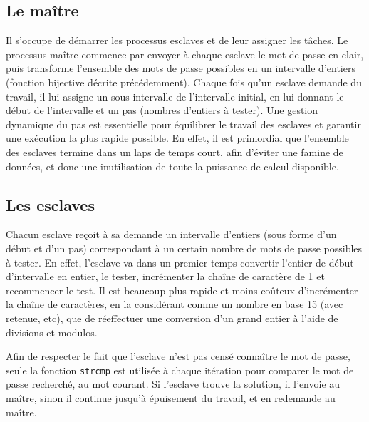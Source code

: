 \documentclass[a4paper,11pt]{article}
\begin{document}
\subsection{Le maître}
Il s'occupe de démarrer les processus esclaves et de leur assigner les tâches. Le processus maître commence par envoyer à chaque esclave le mot de passe en clair, puis transforme l'ensemble des mots de passe possibles en un intervalle d'entiers (fonction bijective décrite précédemment). Chaque fois qu'un esclave demande du travail, il lui assigne un sous intervalle de l'intervalle initial, en lui donnant le début de l'intervalle et un pas (nombres d'entiers à tester).
Une gestion dynamique du pas est essentielle pour équilibrer le travail des esclaves et garantir une exécution la plus rapide possible. En effet, il est primordial que l'ensemble des esclaves termine dans un laps de temps court, afin d'éviter une famine de données, et donc une inutilisation de toute la puissance de calcul disponible.

\subsection{Les esclaves}
Chacun esclave reçoit à sa demande un intervalle d'entiers (sous forme d'un début et d'un pas) correspondant à un certain nombre de mots de passe possibles à tester.
En effet, l'esclave va dans un premier temps convertir l'entier de début d'intervalle en entier, le tester, incrémenter la chaîne de caractère de 1 et recommencer le test.
Il est beaucoup plus rapide et moins coûteux d'incrémenter la chaîne de caractères, en la considérant comme un nombre en base 15 (avec retenue, etc), que de réeffectuer une conversion d'un grand entier à l'aide de divisions et modulos.

Afin de respecter le fait que l'esclave n'est pas censé connaître le mot de passe, seule la fonction \texttt{strcmp} est utilisée à chaque itération pour comparer le mot de passe recherché, au mot courant.
Si l'esclave trouve la solution, il l'envoie au maître, sinon il continue jusqu'à épuisement du travail, et en redemande au maître.
\end{document}
